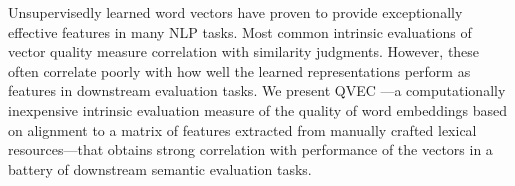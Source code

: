 Unsupervisedly learned word vectors have proven to provide exceptionally effective features in many NLP tasks. Most common intrinsic evaluations of vector quality measure correlation with similarity judgments. However, these often correlate poorly with how well the learned representations perform as features in downstream evaluation tasks. We present QVEC —a computationally inexpensive intrinsic evaluation measure of the quality of word embeddings based on alignment to a matrix of features extracted from manually crafted lexical resources—that obtains strong correlation with performance of the vectors in a battery of downstream semantic evaluation tasks.
